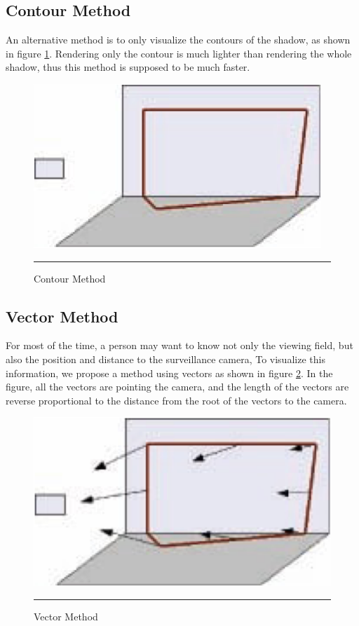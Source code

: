 \subsection{Contour Method}

An alternative method is to only visualize the contours of the shadow, as shown in figure \ref{fig:ContourMethod}. Rendering only the contour is much lighter than rendering the whole shadow, thus this method is supposed to be much faster.

\begin{figure}[htbp]
	\centering
	\includegraphics{./Primitives/theory_contour.png}
	\rule{35em}{0.5pt}
	\caption[Volume Method]{Contour Method}
	\label{fig:ContourMethod}
\end{figure}

\subsection{Vector Method}

For most of the time, a person may want to know not only the viewing field, but also the position and distance to the surveillance camera, To visualize this information, we propose a method using vectors as shown in figure \ref{fig:VectorMethod}. In the figure, all the vectors are pointing the camera, and the length of the vectors are reverse proportional to the distance from the root of the vectors to the camera.

\begin{figure}[htbp]
	\centering
	\includegraphics{./Primitives/theory_vector.png}
	\rule{35em}{0.5pt}
	\caption[Volume Method]{Vector Method}
	\label{fig:VectorMethod}
\end{figure}


